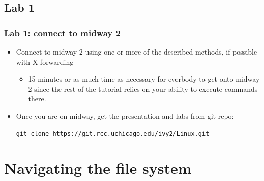 \documentclass{beamer}
\begin{document}
\subsection{Lab 1}
\begin{frame}[fragile]
  \frametitle{Lab 1: connect to midway 2}
  \begin{itemize}
  \item Connect to midway 2 using one or more of the described methods, if possible with X-forwarding 
    \begin{itemize}
    \item 15 minutes or as much time as necessary for everbody to get onto midway 2 since the rest of the tutorial relies on your ability to
    execute commands there.
    \end{itemize}

    \item Once you are on midway, get the presentation and labs from git repo:
{\small
{\color{mycolorcli}
\begin{verbatim}
git clone https://git.rcc.uchicago.edu/ivy2/Linux.git
\end{verbatim}
}
}

  \end{itemize}
\end{frame}

\section{Navigating the file system}
\end{document}
